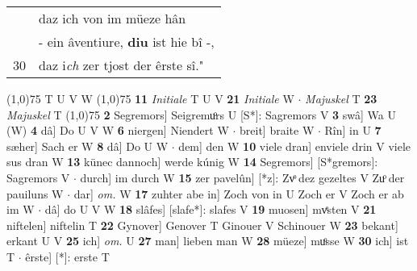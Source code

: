 \documentclass[8pt,a4paper,notitlepage]{article}
\begin{document}
\begin{table}[ht]
\begin{minipage}[t]{0.5\linewidth}
\begin{tabular}{rl}
 & daz ich von im müeze hân\\ 
 & - ein âventiure, \textbf{diu} ist hie bî -,\\ 
30 & daz i\textit{ch} zer tjost der êrste sî."\\ 
\end{tabular}
\scriptsize
\line(1,0){75} \newline
T U V W \newline
\line(1,0){75} \newline
\textbf{11} \textit{Initiale} T U V  \textbf{21} \textit{Initiale} W   $\cdot$ \textit{Majuskel} T  \textbf{23} \textit{Majuskel} T  \newline
\line(1,0){75} \newline
\textbf{2} Segremors] Seigremuͦrs U [S*]: Sagremors V \textbf{3} swâ] Wa U (W) \textbf{4} dâ] Do U V W \textbf{6} niergen] Niendert W  $\cdot$ breit] braite W  $\cdot$ Rîn] in U \textbf{7} sæher] Sach er W \textbf{8} dâ] Do U W  $\cdot$ dem] den W \textbf{10} viele dran] enviele drin V viele sus dran W \textbf{13} künec dannoch] werde kúnig W \textbf{14} Segremors] [S*gremors]: Sagremors V  $\cdot$ durch] im durch W \textbf{15} zer pavelûn] [*z]: Zvͦ dez gezeltes V Zuͦ der pauiluns W  $\cdot$ dar] \textit{om.} W \textbf{17} zuhter abe in] Zoch von in U Zoch er V Zoch er ab im W  $\cdot$ dâ] do U V W \textbf{18} slâfes] [slafe*]: slafes V \textbf{19} muosen] mvͤsten V \textbf{21} niftelen] niftelin T \textbf{22} Gynover] Genover T Ginouer V Schinouer W \textbf{23} bekant] erkant U V \textbf{25} ich] \textit{om.} U \textbf{27} man] lieben man W \textbf{28} müeze] muͦsse W \textbf{30} ich] ist T  $\cdot$ êrste] [*]: erste T \newline
\end{minipage}
\end{table}
\end{document}
